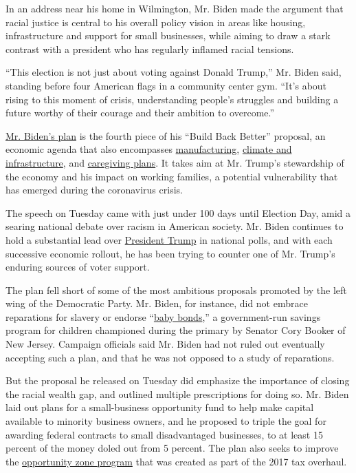 In an address near his home in Wilmington, Mr. Biden made the argument
that racial justice is central to his overall policy vision in areas
like housing, infrastructure and support for small businesses, while
aiming to draw a stark contrast with a president who has regularly
inflamed racial tensions.

``This election is not just about voting against Donald Trump,'' Mr.
Biden said, standing before four American flags in a community center
gym. ``It's about rising to this moment of crisis, understanding
people's struggles and building a future worthy of their courage and
their ambition to overcome.''

\href{https://joebiden.com/racial-economic-equity/}{Mr. Biden's plan} is
the fourth piece of his ``Build Back Better'' proposal, an economic
agenda that also encompasses
\href{https://www.nytimes.com/2020/07/09/us/politics/biden-buy-american.html}{manufacturing},
\href{https://www.nytimes.com/2020/07/14/us/politics/biden-climate-plan.html?smid=tw-share}{climate
and infrastructure}, and
\href{https://www.nytimes.com/2020/07/21/us/politics/biden-workplace-childcare.html}{caregiving
plans}. It takes aim at Mr. Trump's stewardship of the economy and his
impact on working families, a potential vulnerability that has emerged
during the coronavirus crisis.

The speech on Tuesday came with just under 100 days until Election Day,
amid a searing national debate over racism in American society. Mr.
Biden continues to hold a substantial lead over
\href{https://www.nytimes.com/interactive/2020/us/elections/donald-trump.html}{President
Trump} in national polls, and with each successive economic rollout, he
has been trying to counter one of Mr. Trump's enduring sources of voter
support.

The plan fell short of some of the most ambitious proposals promoted by
the left wing of the Democratic Party. Mr. Biden, for instance, did not
embrace reparations for slavery or endorse
``\href{https://www.nytimes.com/2019/04/06/us/politics/cory-booker-2020-baby-bonds.html}{baby
bonds},'' a government-run savings program for children championed
during the primary by Senator Cory Booker of New Jersey. Campaign
officials said Mr. Biden had not ruled out eventually accepting such a
plan, and that he was not opposed to a study of reparations.

But the proposal he released on Tuesday did emphasize the importance of
closing the racial wealth gap, and outlined multiple prescriptions for
doing so. Mr. Biden laid out plans for a small-business opportunity fund
to help make capital available to minority business owners, and he
proposed to triple the goal for awarding federal contracts to small
disadvantaged businesses, to at least 15 percent of the money doled out
from 5 percent. The plan also seeks to improve the
\href{https://www.nytimes.com/2019/08/31/business/tax-opportunity-zones.html}{opportunity
zone program} that was created as part of the 2017 tax overhaul.

